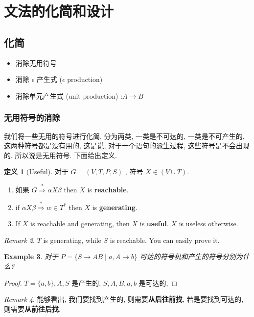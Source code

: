 \documentclass[12pt]{ctexart}
\theoremstyle{definition}
\theoremstyle{definition}
\newtheorem{definition}{定义}[section]
\theoremstyle{plain}
\newtheorem{exam}[definition]{Example}
\theoremstyle{remark}
\newtheorem{remark}[definition]{Remark}
\begin{document}

\section{文法的化简和设计}
\label{sec:文法的化简和设计}
\subsection{化简}

\begin{itemize}
\item [1] 
消除无用符号
\item [2] 
消除 \( \epsilon\) 产生式 (\( \epsilon\) production)
\item [3] 
消除单元产生式 (unit production) :\(A \to B\)
\end{itemize}

\subsubsection{无用符号的消除}
我们将一些无用的符号进行化简, 分为两类, 一类是不可达的, 一类是不可产生的, 这两种符号都是没有用的, 这是说, 对于一个语句的派生过程, 这些符号是不会出现的. 所以说是无用符号. 下面给出定义. 
\begin{definition}[Useful]\label{def:Useful}
对于 \(G = (V , T , P , S)\) , 符号 \(X \in (V \cup T )\). 
\begin{enumerate}
\item  如果 \(G \overset{*}{\Rightarrow}\alpha X\beta\) then \(X\) is \textbf{reachable}. 
\item  if \(\alpha X\beta \overset{*}{\Rightarrow} w \in T ^{*}\)  then \(X\) is \textbf{generating}. 
\item  If \(X\) is reachable and generating, then \(X\) is \textbf{useful}. \(X\) is useless otherwise. 
\end{enumerate}
\end{definition}
\begin{remark}
\(T\) is generating, while \(S\) is reachable. You can easily prove it.
\end{remark}

\begin{exam}
	对于 \(P =\{ S \to A B \mid a , A \to b\} \)
	可达的符号机和产生的符号分别为什么? 
\end{exam}
\begin{proof}
	\(T = \{ a, b \} , A, S\) 是产生的, \(S , A , B , a, b\) 是可达的, 
\end{proof}
\begin{remark}
能够看出, 我们要找到产生的, 则需要\textbf{从后往前找}, 若是要找到可达的, 则需要\textbf{从前往后找}. 
\end{remark}
\end{document}

